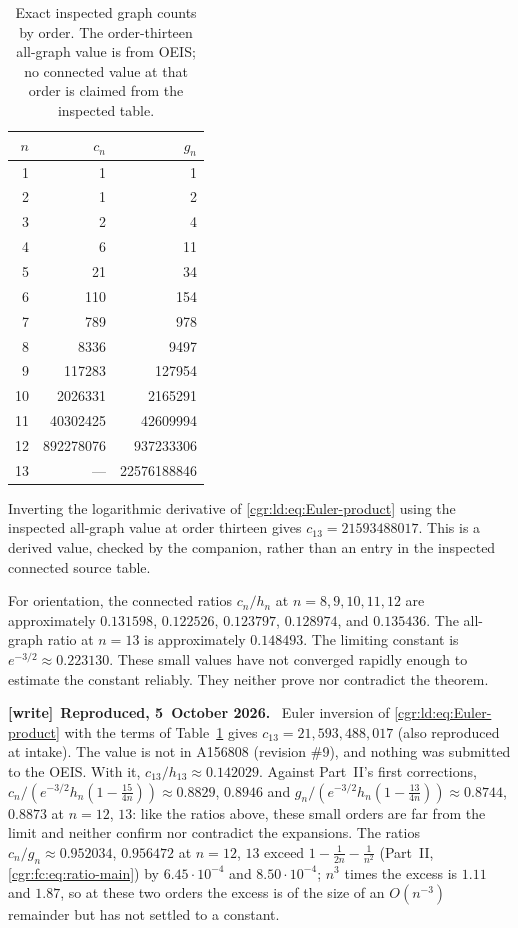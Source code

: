 \documentclass[11pt,letterpaper]{article}
\numberwithin{equation}{section}
\theoremstyle{definition}\newtheorem{definition}[theorem]{Definition}
\theoremstyle{remark}\newtheorem{remark}[theorem]{Remark}
\newenvironment{writenote}[1][]{\par\smallskip\begingroup\small
 \noindent\textbf{[write]}\if\relax\detokenize{#1}\relax\else~\textbf{#1.}\fi\ }%
 {\par\endgroup\smallskip}
\begin{document}
\begin{table}[htbp]
\centering
\caption{Exact inspected graph counts by order. The order-thirteen
all-graph value is from OEIS; no connected value at that order is
claimed from the inspected table.}\label{cgr:ld:tab:counts}
\begin{tabular}{rrr}
\toprule
$n$&$c_n$&$g_n$\\\midrule
1&1&1\\2&1&2\\3&2&4\\4&6&11\\5&21&34\\
6&110&154\\7&789&978\\8&8336&9497\\
9&117283&127954\\10&2026331&2165291\\
11&40302425&42609994\\12&892278076&937233306\\
13&---&22576188846\\\bottomrule
\end{tabular}
\end{table}

Inverting the logarithmic derivative of \eqref{cgr:ld:eq:Euler-product}
using the inspected all-graph value at order thirteen gives
$c_{13}=21593488017$. This is a derived value, checked by the
companion, rather than an entry in the inspected connected source
table.

For orientation, the connected ratios $c_n/h_n$ at
$n=8,9,10,11,12$ are approximately
$0.131598$, $0.122526$, $0.123797$, $0.128974$, and
$0.135436$. The all-graph ratio at $n=13$ is approximately
$0.148493$. The limiting constant is
$e^{-3/2}\approx0.223130$. These small values have not converged
rapidly enough to estimate the constant reliably. They neither
prove nor contradict the theorem.
\begin{writenote}[Reproduced, 5~October 2026]
Euler inversion of \eqref{cgr:ld:eq:Euler-product} with the terms of Table~\ref{cgr:ld:tab:counts} gives $c_{13}=21{,}593{,}488{,}017$ (also reproduced at intake). The value is not in A156808 (revision \#9), and nothing was submitted to the OEIS. With it, $c_{13}/h_{13}\approx0.142029$. Against Part~II's first corrections, $c_n/(e^{-3/2}h_n(1-\frac{15}{4n}))\approx0.8829$, $0.8946$ and $g_n/(e^{-3/2}h_n(1-\frac{13}{4n}))\approx0.8744$, $0.8873$ at $n=12$, $13$: like the ratios above, these small orders are far from the limit and neither confirm nor contradict the expansions. The ratios $c_n/g_n\approx0.952034$, $0.956472$ at $n=12$, $13$ exceed $1-\frac1{2n}-\frac1{n^2}$ (Part~II, \eqref{cgr:fc:eq:ratio-main}) by $6.45\cdot10^{-4}$ and $8.50\cdot10^{-4}$; $n^3$ times the excess is $1.11$ and $1.87$, so at these two orders the excess is of the size of an $O(n^{-3})$ remainder but has not settled to a constant.
\end{writenote}
\end{document}
